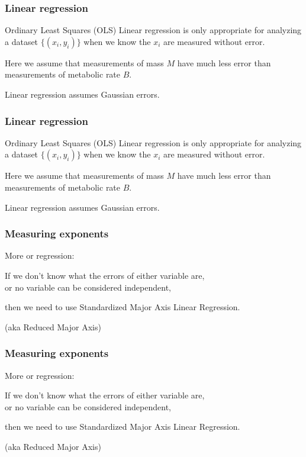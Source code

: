\begin{frame}
  \frametitle{Linear regression}


Ordinary Least Squares (OLS) Linear regression 
is only appropriate for analyzing
a dataset $\{(x_i,y_i)\}$
when we know the $x_i$ are measured without error.

Here we assume that measurements of mass $M$
have much less error than measurements of metabolic rate $B$.

\inv

Linear regression assumes Gaussian errors.

\vis

\end{frame}

\begin{frame}
  \frametitle{Linear regression}


Ordinary Least Squares (OLS) Linear regression 
is only appropriate for analyzing
a dataset $\{(x_i,y_i)\}$
when we know the $x_i$ are measured without error.

Here we assume that measurements of mass $M$
have much less error than measurements of metabolic rate $B$.

Linear regression assumes Gaussian errors.

\end{frame}

\begin{frame}
  \frametitle{Measuring exponents}

More or regression:

If  we don't know what the errors of either variable are,\\
or  no variable can be considered independent,

\inv

then we need to use Standardized Major Axis Linear Regression.

{\small (aka Reduced Major Axis)}

\vis 

\end{frame}

\begin{frame}
  \frametitle{Measuring exponents}

More or regression:

If  we don't know what the errors of either variable are,\\
or  no variable can be considered independent,

then we need to use Standardized Major Axis Linear Regression.

{\small (aka Reduced Major Axis)}

\end{frame}

